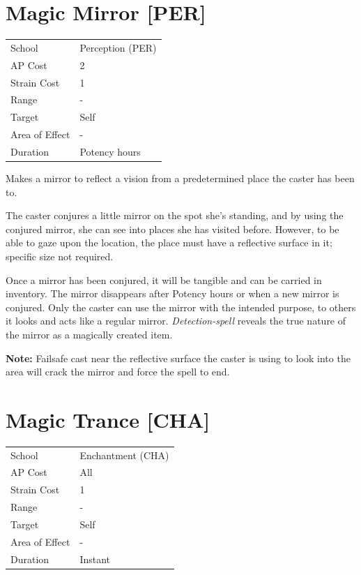 \documentclass[11pt,a4paper,twocolumn]{book}
\begin{document}
\section*{Magic Mirror [PER]}
{
	\begin{tabu} to 75mm{| X[l,4] | X[l,7] |}
		\hline
		School 			& Perception (PER) 		\\
        AP Cost	      	& 2 					\\
        Strain Cost     & 1 					\\
        Range     		& -						\\
        Target      	& Self					\\
        Area of Effect  & -  	 				\\
        Duration     	& Potency hours			\\ \hline
	\end{tabu}
		
}

\medskip

Makes a mirror to reflect a vision from a predetermined place the caster has been to.

The caster conjures a little mirror on the spot she's standing, and by using the conjured mirror, she can see into places she has visited before. However, to be able to gaze upon the location, the place must have a reflective surface in it; specific size not required.

Once a mirror has been conjured, it will be tangible and can be carried in inventory. The mirror disappears after Potency hours or when a new mirror is conjured. Only the caster can use the mirror with the intended purpose, to others it looks and acts like a regular mirror. \textit{Detection-spell} reveals the true nature of the mirror as a magically created item.

\textbf{Note:} Failsafe cast near the reflective surface the caster is using to look into the area will crack the mirror and force the spell to end.

\vfill


\section*{Magic Trance [CHA]}
{
	\begin{tabu} to 75mm{| X[l,4] | X[l,7] |}
		\hline
		School 			& Enchantment (CHA) 		\\
        AP Cost	      	& All 					\\
        Strain Cost     & 1 					\\
        Range     		& -						\\
        Target      	& Self					\\
        Area of Effect  & -  	 				\\
        Duration     	& Instant			\\ \hline
	\end{tabu}
		
}
\end{document}
